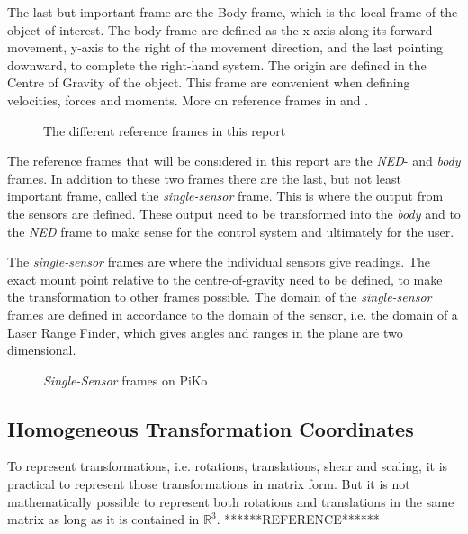 	The last but important frame are the Body frame, which is the local frame of the object of interest.
	The body frame are defined as the x-axis along its forward movement, y-axis to the right of the
	movement direction, and the last pointing downward, to complete the right-hand system. The
	origin are defined in the Centre of Gravity of the object. This frame are convenient when
	defining velocities, forces and moments. More on reference frames in \cite{fossen} and
    \cite{forsell}.
    \begin{figure}[htbp]
        \centering
        \caption{The different reference frames in this report}
        \label{chap2:fig-ref-frames}
    \end{figure}

    The reference frames that will be considered in this report are the \emph{NED}- and
    \emph{body} frames. In addition to these two frames there are the last, but not least
    important frame, called the \emph{single-sensor} frame. This is where the output from
    the sensors are defined. These output need to be transformed into the \emph{body} and
    to the \emph{NED} frame to make sense for the control system and ultimately for the
    user. 

    The \emph{single-sensor} frames are where the individual sensors give readings. The
    exact mount point relative to the centre-of-gravity need to be defined, to make the
    transformation to other frames possible. The domain of the \emph{single-sensor} frames
    are defined in accordance to the domain of the sensor, i.e. the domain of a Laser
    Range Finder, which gives angles and ranges in the plane are two dimensional. 

    \begin{figure}[htbp]
        \centering
        \caption{\emph{Single-Sensor} frames on PiKo}
        \label{chap2:fig-single-sensor-frames}
    \end{figure}


\subsection{Homogeneous Transformation Coordinates}
To represent transformations, i.e. rotations, translations, shear and scaling, it is
practical to represent those transformations in matrix form. But it is not mathematically
possible to represent both rotations and translations in the same matrix as long as it is
contained in $\mathbb{R}^3$. ******REFERENCE******

